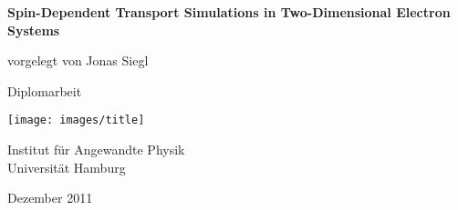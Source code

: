 \begin{titlepage}
\begin{center}
\vspace{2cm}
  \begin{spacing}{1.1}
    \huge\textbf{Spin-Dependent Transport Simulations in Two-Dimensional Electron Systems}
  \end{spacing}
  \par
  \vspace{.5in}
  {\large vorgelegt von Jonas Siegl}\par
  \vspace{.5in}
  {\Large Diplomarbeit}
  \par

  \vfill
  \vspace{.5in}
  \texttt{[image: images/title]}
  \par
  \vspace{.5in}
  Institut f\"ur Angewandte Physik\\
  Universit\"at Hamburg
  \par
  \vspace{0.5in}
  Dezember 2011
\end{center}
\end{titlepage}
